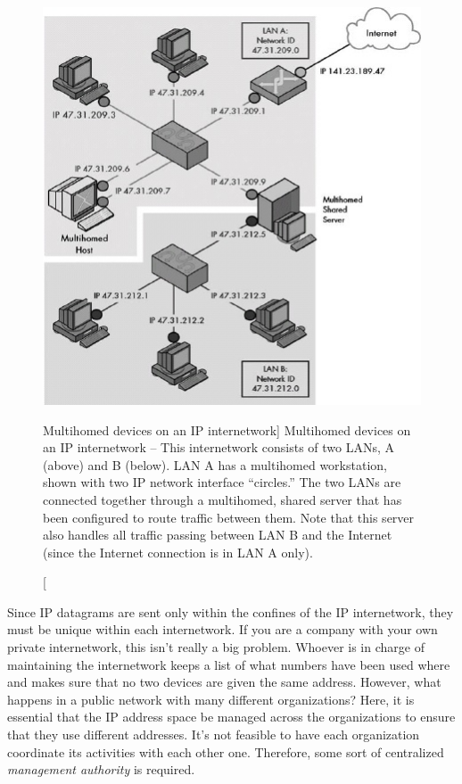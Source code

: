 \begin{figure}
   \centering
   \includegraphics[width=\textwidth]{images/multihomed-devices.jpg}
   \caption
      [Multihomed devices on an IP internetwork]
      {Multihomed devices on an IP internetwork -- This internetwork consists of two LANs, A (above) and B (below).
      LAN A has a multihomed workstation, shown with two IP network interface ``circles.''
      The two LANs are connected together through a multihomed, shared server that has been configured to route traffic between them.
      Note that this server also handles all traffic passing between LAN B and the Internet (since the Internet connection is in LAN A only).
      }
   \label{fig:multihomed-devices}
\end{figure}


Since IP datagrams are sent only within the confines of the IP
internetwork, they must be unique within each internetwork. If you are a
company with your own private internetwork, this isn't really a big
problem. Whoever is in charge of maintaining the internetwork keeps a
list of what numbers have been used where and makes sure that no two devices are
given the same address. However, what happens in a public network with
many different organizations? Here, it is essential that the IP address
space be managed across the organizations to ensure that they use
different addresses. It's not feasible to have each organization
coordinate its activities with each other one. Therefore, some sort of
centralized {\emph{management authority}} is required.

